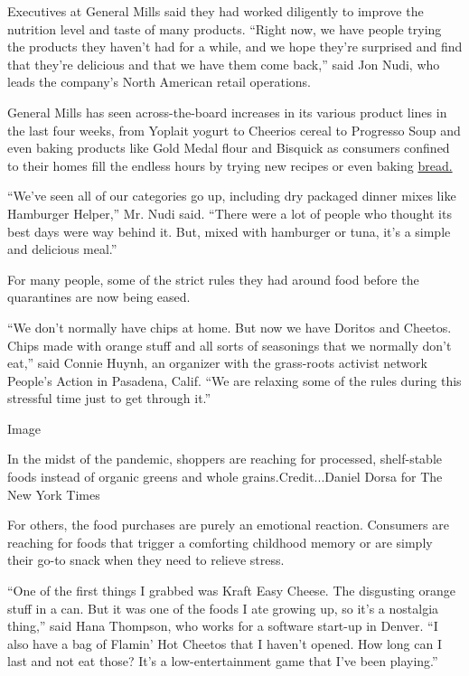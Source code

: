 Executives at General Mills said they had worked diligently to improve
the nutrition level and taste of many products. ``Right now, we have
people trying the products they haven't had for a while, and we hope
they're surprised and find that they're delicious and that we have them
come back,'' said Jon Nudi, who leads the company's North American
retail operations.

General Mills has seen across-the-board increases in its various product
lines in the last four weeks, from Yoplait yogurt to Cheerios cereal to
Progresso Soup and even baking products like Gold Medal flour and
Bisquick as consumers confined to their homes fill the endless hours by
trying new recipes or even baking
\href{https://www.nytimes3xbfgragh.onion/2020/03/30/style/bread-baking-coronavirus.html}{bread.}

``We've seen all of our categories go up, including dry packaged dinner
mixes like Hamburger Helper,'' Mr. Nudi said. ``There were a lot of
people who thought its best days were way behind it. But, mixed with
hamburger or tuna, it's a simple and delicious meal.''

For many people, some of the strict rules they had around food before
the quarantines are now being eased.

``We don't normally have chips at home. But now we have Doritos and
Cheetos. Chips made with orange stuff and all sorts of seasonings that
we normally don't eat,'' said Connie Huynh, an organizer with the
grass-roots activist network People's Action in Pasadena, Calif. ``We
are relaxing some of the rules during this stressful time just to get
through it.''

Image

In the midst of the pandemic, shoppers are reaching for processed,
shelf-stable foods instead of organic greens and whole
grains.Credit...Daniel Dorsa for The New York Times

For others, the food purchases are purely an emotional reaction.
Consumers are reaching for foods that trigger a comforting childhood
memory or are simply their go-to snack when they need to relieve stress.

``One of the first things I grabbed was Kraft Easy Cheese. The
disgusting orange stuff in a can. But it was one of the foods I ate
growing up, so it's a nostalgia thing,'' said Hana Thompson, who works
for a software start-up in Denver. ``I also have a bag of Flamin' Hot
Cheetos that I haven't opened. How long can I last and not eat those?
It's a low-entertainment game that I've been playing.''

